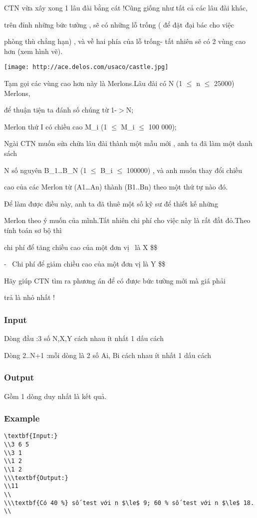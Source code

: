 



   CTN vừa xây xong 1 lâu đài bằng cát !Cũng giống như tất cả các lâu đài khác,  

   trên đỉnh những bức tường , sẽ có những lỗ trống ( để đặt đại bác cho việc  

   phòng thù chẳng hạn) , và về hai phía của lỗ trống- tất nhiên sẽ có 2 vùng cao hơn (xem hình vẽ).  


\texttt{[image: http://ace.delos.com/usaco/castle.jpg]}

   Tạm gọi các vùng cao hơn này là Merlons.Lâu đài có N (1 $\le$ n $\le$ 25000) Merlons,  

   để thuận tiện ta đánh số chúng từ 1-$>$N;  

   Merlon thứ I có chiều cao M\_i (1 $\le$ M\_i $\le$ 100 000);  

   Ngài CTN muốn sửa chữa lâu đài thành một mẫu mới , anh ta đã làm một danh sách  

   N số nguyên B\_1…B\_N (1 $\le$ B\_i $\le$ 100000) , và anh muốn thay đổi chiều  

   cao của các Merlon từ (A1…An) thành (B1..Bn) theo một thứ tự nào đó.  



   Để làm được điều này, anh ta đã thuê một số kỹ sư để thiết kế những  

   Merlon theo ý muốn của mình.Tất nhiên chi phí cho việc này là rất đắt đỏ.Theo tính toán sơ bộ thì  

   chi phí để tăng chiều cao của một đơn vị  là X \$\$  

   -  Chi phí để giảm chiều cao của một đơn vị là Y \$\$  

   Hãy giúp CTN tìm ra phương án để có được bức tường mới mà giá phải  

   trả là nhỏ nhất !  

\subsubsection{   Input  }

   Dòng đầu :3 số N,X,Y cách nhau ít nhất 1 dấu cách  

   Dòng 2..N+1 :mỗi dòng là 2 số Ai, Bi cách nhau ít nhất 1 dấu cách  

\subsubsection{   Output  }

   Gồm 1 dòng duy nhất là kết quả.  

\subsubsection{   Example  }
\begin{verbatim}
\textbf{Input:}
\\3 6 5
\\3 1
\\1 2
\\1 2
\\\textbf{Output:}
\\11
\\
\\\textbf{Có 40 %} số test với n $\le$ 9; 60 % số test với n $\le$ 18.
\\\end{verbatim}

